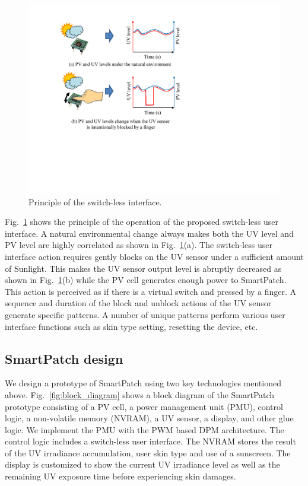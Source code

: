 \documentclass[journal]{IEEEtran}
\begin{document}
\begin{figure}
\centering
\includegraphics[width=0.8\hsize]{Figures/switchless_interface.pdf}
\caption{Principle of the switch-less interface.}
\label{fig:switchless_interface}
\end{figure}      

Fig.~\ref{fig:switchless_interface} shows the principle of the operation of the proposed switch-less user interface.
A natural environmental change always makes both the UV level and PV level are highly correlated as shown in Fig.~\ref{fig:switchless_interface}(a). 
The switch-less user interface action requires gently blocks on the UV sensor under a sufficient amount of Sunlight. 
This makes the UV sensor output level is abruptly decreased as shown in Fig.~\ref{fig:switchless_interface}(b) while the PV cell generates enough power to SmartPatch. 
This action is perceived as if there is a virtual switch and pressed by a finger. 
A sequence and duration of the block and unblock actions of the UV sensor generate specific patterns. 
A number of unique patterns perform various user interface functions such as skin type setting, resetting the device, etc. 

\subsection{SmartPatch design}

We design a prototype of SmartPatch using two key technologies mentioned above. 
Fig.~\ref{fig:block_diagram} shows a block diagram of the SmartPatch prototype consisting of a PV cell, a power management unit (PMU), control logic, a non-volatile memory (NVRAM), a UV sensor, a display, and other glue logic. 
We implement the PMU with the PWM based DPM architecture.
The control logic includes a switch-less user interface. 
The NVRAM stores the result of the UV irradiance accumulation, user skin type and use of a sunscreen. 
The display is customized to show the current UV irradiance level as well as the remaining UV exposure time before experiencing skin damages. 
\end{document}
